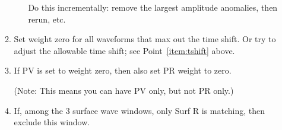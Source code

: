 \begin{enumerate}
\begin{enumerate}
\begin{enumerate}
Do this incrementally: remove the largest amplitude anomalies, then rerun, etc.

\end{enumerate}

\item Set weight zero for all waveforms that max out the time shift. Or try to adjust the allowable time shift; see Point~\ref{item:tshift} above.


\item If PV is set to weight zero, then also set PR weight to zero.

(Note: This means you can have PV only, but not PR only.)





\item If, among the 3 surface wave windows, only Surf R is matching, then exclude this window.




\end{enumerate}
\end{enumerate}
